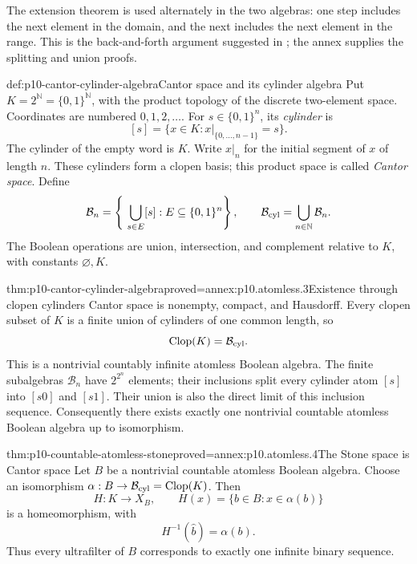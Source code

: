 The extension theorem is used alternately in the two algebras:
one step includes the next element in the domain, and the next
includes the next element in the range.
This is the back-and-forth argument suggested in
\cite[Chapter~IV, \S1, Exercise~5, p.~121]{BurrisSankappanavar2012};
the annex supplies the splitting and union proofs.

\begin{hbdefinition}{def:p10-cantor-cylinder-algebra}{Cantor space and its cylinder algebra}
Put \(K=2^{\mathbb N}=\{0,1\}^{\mathbb N}\), with the product
topology of the discrete two-element space.
Coordinates are numbered \(0,1,2,\ldots\).
For \(s\in\{0,1\}^n\), its \emph{cylinder} is
\[
 [s]=\{x\in K:x|_{\{0,\ldots,n-1\}}=s\}.
\]
The cylinder of the empty word is \(K\).
Write \(x|_n\) for the initial segment of \(x\) of length \(n\).
These cylinders form a clopen basis; this product space is called
\emph{Cantor space}.
Define
\[
 \mathcal B_n
   =\left\{\ \bigcup_{s\in E}[s]:E\subseteq\{0,1\}^n\right\},
 \qquad
 \mathcal B_{\rm cyl}=\bigcup_{n\in\mathbb N}\mathcal B_n.
\]
The Boolean operations are union, intersection, and complement
relative to \(K\), with constants \(\varnothing,K\).
\end{hbdefinition}

\begin{hbtheorem}{thm:p10-cantor-cylinder-algebra}{proved=annex:p10.atomless.3}{Existence through clopen cylinders}
Cantor space is nonempty, compact, and Hausdorff.
Every clopen subset of \(K\) is a finite union of cylinders of
one common length, so
\[
 \operatorname{Clop}(K)=\mathcal B_{\rm cyl}.
\]
This is a nontrivial countably infinite atomless Boolean algebra.
The finite subalgebras \(\mathcal B_n\) have
\(2^{2^n}\) elements; their inclusions split every cylinder atom
\([s]\) into \([s0]\) and \([s1]\).
Their union is also the direct limit of this inclusion sequence.
Consequently there exists exactly one nontrivial countable atomless
Boolean algebra up to isomorphism.
\end{hbtheorem}

\begin{hbtheorem}{thm:p10-countable-atomless-stone}{proved=annex:p10.atomless.4}{The Stone space is Cantor space}
Let \(B\) be a nontrivial countable atomless Boolean algebra.
Choose an isomorphism
\(\alpha:B\to\mathcal B_{\rm cyl}=\operatorname{Clop}(K)\).
Then
\[
 H:K\longrightarrow X_B,\qquad
 H(x)=\{b\in B:x\in\alpha(b)\}
\]
is a homeomorphism, with
\[
 H^{-1}(\widehat b)=\alpha(b).
\]
Thus every ultrafilter of \(B\) corresponds to exactly one infinite
binary sequence.
\end{hbtheorem}

